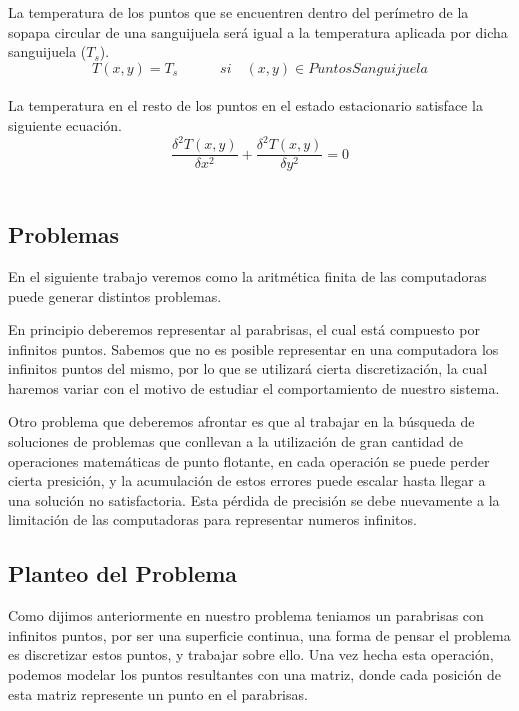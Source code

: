 La temperatura de los puntos que se encuentren dentro del perímetro de la sopapa circular de una sanguijuela será igual a la temperatura aplicada por dicha sanguijuela ($T_s$).\\

\begin{equation}
T(x,y)=T_s	\quad	\quad	\quad si \quad (x,y)\in PuntosSanguijuela
\end{equation}\\




La temperatura en el resto de los puntos en el estado estacionario satisface la siguiente ecuación.\\

\begin{equation}
\frac{\delta ^2 T(x,y)}{\delta x^2}+\frac{\delta ^2 T(x,y)}{\delta y^2}=0 
\end{equation}\\





\subsection{Problemas}

En el siguiente trabajo veremos como la aritmética finita de las computadoras puede generar distintos problemas.

En principio deberemos representar al parabrisas, el cual está compuesto por infinitos puntos. Sabemos que no es posible representar en una computadora los infinitos puntos del mismo, por lo que se utilizará cierta discretización, la cual haremos variar con el motivo de estudiar el comportamiento de nuestro sistema.

Otro problema que deberemos afrontar es que al trabajar en la búsqueda de soluciones de problemas que conllevan a la utilización de gran cantidad de operaciones matemáticas de punto flotante, en cada operación se puede perder cierta presición, y la acumulación de estos errores puede escalar hasta llegar a una solución no satisfactoria. Esta pérdida de precisión se debe nuevamente a la limitación de las computadoras para representar numeros infinitos.


\subsection{Planteo del Problema}
Como dijimos anteriormente en nuestro problema teniamos un parabrisas con infinitos puntos, por ser una superficie continua, una forma de pensar el problema es discretizar estos puntos, y trabajar sobre ello. Una vez hecha esta operación, podemos modelar los puntos resultantes con una matriz, donde cada posición de esta matriz represente un punto en el parabrisas.

